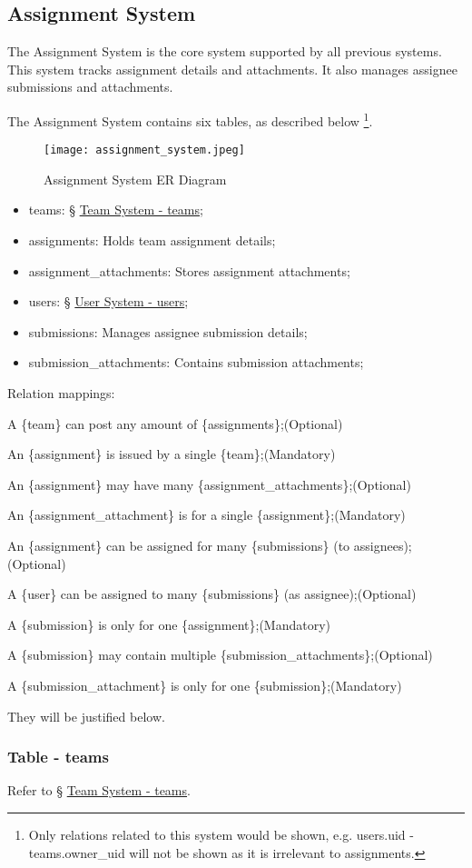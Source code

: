 \documentclass[12pt]{report}
\newcommand{\n}{\par}
\newcommand{\br}{\n\vspace{1 em}\n}
\begin{document}
\subsection{Assignment System} \label{data-layer.design.assignment-system}
The Assignment System is the core system supported by all previous systems.
This system tracks assignment details and attachments.
It also manages assignee submissions and attachments.
\br
The Assignment System contains six tables, as described below
\footnote{Only relations related to this system would be shown,
	e.g. users.uid - teams.owner\_uid will not be shown as it is irrelevant to assignments.}.
\begin{figure}[h!]
	\centering
	\texttt{[image: assignment\_system.jpeg]}
	\caption{Assignment System ER Diagram}
	\label{fig:assignment-system-er}
\end{figure}
\begin{itemize}
	\item teams: \S{} \hyperref[data-layer.design.team-system.teams]{Team System - teams};
	\item assignments: Holds team assignment details;
	\item assignment\_attachments: Stores assignment attachments;
	\item users: \S{} \hyperref[data-layer.design.user-system.users]{User System - users};
	\item submissions: Manages assignee submission details;
	\item submission\_attachments: Contains submission attachments;
\end{itemize}
Relation mappings:\n
A \{team\} can post any amount of \{assignments\};\null\hfill (Optional)\n
An \{assignment\} is issued by a single \{team\};\null\hfill (Mandatory)
\br
An \{assignment\} may have many \{assignment\_attachments\};\null\hfill (Optional)\n
An \{assignment\_attachment\} is for a single \{assignment\};\null\hfill (Mandatory)
\br
An \{assignment\} can be assigned for many \{submissions\} (to assignees);\null\hfill (Optional)\n
A \{user\} can be assigned to many \{submissions\} (as assignee);\null\hfill (Optional)\n
A \{submission\} is only for one \{assignment\};\null\hfill (Mandatory)
\br
A \{submission\} may contain multiple \{submission\_attachments\};\null\hfill (Optional)\n
A \{submission\_attachment\} is only for one \{submission\};\null\hfill (Mandatory)
\br
They will be justified below.

\subsubsection{Table - teams} \label{data-layer.design.assignment-system.teams}
Refer to \S{} \hyperref[data-layer.design.team-system.teams]{Team System - teams}.
\end{document}
